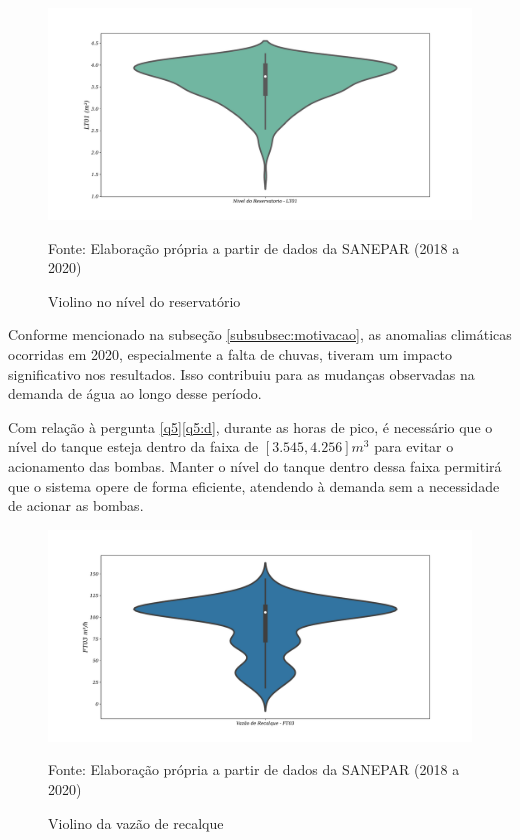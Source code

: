	
	\begin{figure}[H]
		\centering
		\caption{Violino no nível do reservatório}
		\label{fig:hist}
		\includegraphics[width=0.9\linewidth]{Resultados/Figuras/viol}
		
		Fonte: Elaboração própria a partir de dados da SANEPAR (2018 a 2020)
	\end{figure}
	
Conforme mencionado na subseção \ref{subsubsec:motivacao}, as anomalias climáticas ocorridas em 2020, especialmente a falta de chuvas, tiveram um impacto significativo nos resultados. Isso contribuiu para as mudanças observadas na demanda de água ao longo desse período.

Com relação à pergunta \ref{q5}\ref{q5:d}, durante as horas de pico, é necessário que o nível do tanque esteja dentro da faixa de $[3.545,4.256] m^3$ para evitar o acionamento das bombas. Manter o nível do tanque dentro dessa faixa permitirá que o sistema opere de forma eficiente, atendendo à demanda sem a necessidade de acionar as bombas.
	
	
	\begin{figure}[H]
		\centering
		\caption{Violino da vazão de recalque}
		\label{fig:ft03}
		\includegraphics[width=0.9\linewidth]{Resultados/Figuras/ft03}
		
		Fonte: Elaboração própria a partir de dados da SANEPAR (2018 a 2020)
	\end{figure}
	

